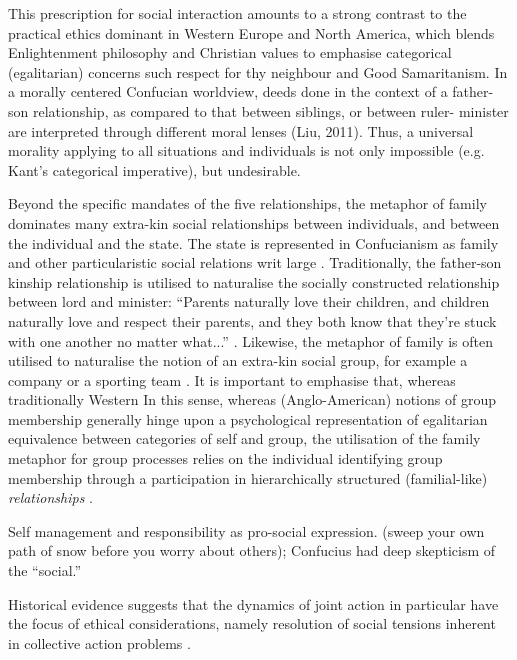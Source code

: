 {This prescription for social interaction amounts to a strong contrast to the practical ethics dominant in Western Europe and North America, which blends Enlightenment philosophy and Christian values to emphasise categorical (egalitarian) concerns such respect for thy neighbour and Good Samaritanism. In a morally centered Confucian worldview, deeds done in the context of a father-son relationship, as compared to that between siblings, or between ruler- minister are interpreted through different moral lenses (Liu, 2011).  Thus, a universal morality applying to all situations and individuals is not only impossible (e.g. Kant’s categorical imperative), but undesirable.

Beyond the specific mandates of the five relationships, the metaphor of family dominates many extra-kin social relationships between individuals, and between the individual and the state. The state is represented in Confucianism as family and other particularistic social relations writ large \citep[579]{Liu2009}.  Traditionally, the father-son kinship relationship is utilised to naturalise the socially constructed relationship between lord and minister: ``Parents naturally love their children, and children naturally love and respect their parents, and they both know that they're stuck with one another no matter what...'' \citep[178]{Slingerland2014}. Likewise, the metaphor of family is often utilised to naturalise the notion of an extra-kin social group, for example a company or a sporting team \citep{Brownell2008}.
It is important to emphasise that, whereas traditionally Western In this sense, whereas (Anglo-American) notions of group membership generally hinge upon a psychological representation of egalitarian equivalence between categories of self and group, the utilisation of the family metaphor for group processes relies on the individual identifying group membership through a participation in hierarchically structured (familial-like) \textit{relationships} \citep{Fei1992}.


Self management and responsibility as pro-social expression.  (sweep your own path of snow before you worry about others); Confucius had deep skepticism of the ``social.''


Historical evidence suggests that the dynamics of joint action in particular have the focus of ethical considerations, namely resolution of social tensions inherent in collective action problems \citep{Slingerland2014}.

}
